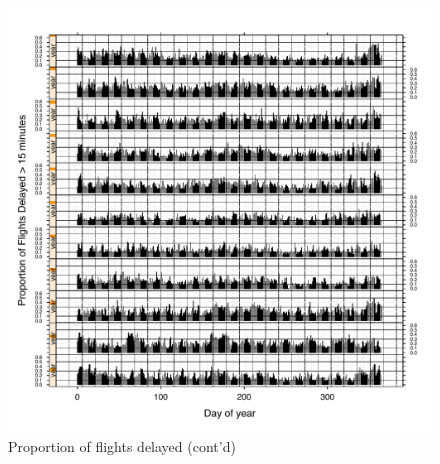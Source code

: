 \documentclass[letterpaper,10pt,english]{sphinxmanual}
\begin{document}
\begin{figure}[htbp]
\centering

\includegraphics{propdelayed_2.pdf}
\caption{Proportion of flights delayed (cont'd)}\end{figure}
\end{document}
